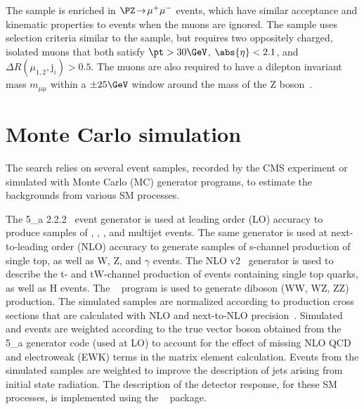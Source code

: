 The \mmj sample is enriched in $\PZ\! \rightarrow\!  \mu^+\mu^-$
events, which have similar acceptance and kinematic properties to
\znunuj events when the muons are ignored. The sample uses selection
criteria similar to the \mj sample, but requires two oppositely
charged, isolated muons that both satisfy $\pt > 30\GeV$, $\abs{\eta}
< 2.1$, and ${\Delta}R(\mu_{1,2},\text{j}_i) > 0.5$. The muons are
also required to have a dilepton invariant mass $m_{\mu\mu}$ within a
${\pm}25\GeV$ window around the mass of the Z
boson~\cite{1674-1137-38-9-090001}.


\clearpage
\section{Monte Carlo simulation}
\label{sec:simulation}

The search relies on several event samples, recorded by the CMS
experiment or simulated with Monte Carlo (MC) generator programs, to
estimate the backgrounds from various SM processes.

The {\MADGRAPH{}5\_a\MCATNLO} 2.2.2~\cite{Alwall2014} event generator
is used at leading order (LO) accuracy to produce samples of \wj, \zj,
\ttbar, and multijet events. The same generator is used at
next-to-leading order (NLO) accuracy to generate samples of s-channel
production of single top, as well as {\ttbar}W, {\ttbar}Z, and
{\ttbar}$\gamma$ events. The NLO \POWHEG v2~\cite{powheg,
  powheg_top_Wt} generator is used to describe the t- and tW-channel
production of events containing single top quarks, as well as
{\ttbar}H events. The ~\cite{pythia} program is used to
generate diboson (WW, WZ, ZZ) production. The simulated samples are
normalized according to production cross sections that are calculated
with NLO and next-to-NLO precision~\cite{Alwall2014, wphys, fewz,
  wwxs, top++, nlotop, powheg_top_Wt}. Simulated \wj and \zj events
are weighted according to the true vector boson \pt obtained from the
{\MADGRAPH{}5\_a\MCATNLO} generator code (used at LO) to account for
the effect of missing NLO QCD and electroweak (EWK) terms in the
matrix element calculation. Events from the \ttbar simulated samples
are weighted to improve the description of jets arising from initial
state radiation. The description of the detector response, for these
SM processes, is implemented using the \GEANTfour~\cite{geant}
package.

